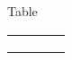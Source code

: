 \documentclass{article}
\begin{document}
	
Table

\begin{tabular}{c|c|c|c}
	&  &  &  \\
	\hline
	&  &  &  \\
	\hline
	&  &  &  \\
	\hline
	&  &  &  \\
\end{tabular}
	
\end{document}

